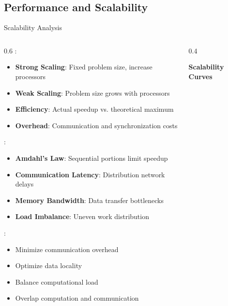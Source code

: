 \subsection{Performance and Scalability}

\begin{frame}{Scalability Analysis}
\begin{columns}
\begin{column}{0.6\textwidth}
:
\begin{itemize}
\item \textbf{Strong Scaling}: Fixed problem size, increase processors
\item \textbf{Weak Scaling}: Problem size grows with processors
\item \textbf{Efficiency}: Actual speedup vs. theoretical maximum
\item \textbf{Overhead}: Communication and synchronization costs
\end{itemize}

\vspace{0.3cm}
:
\begin{itemize}
\item \textbf{Amdahl's Law}: Sequential portions limit speedup
\item \textbf{Communication Latency}: Distribution network delays
\item \textbf{Memory Bandwidth}: Data transfer bottlenecks
\item \textbf{Load Imbalance}: Uneven work distribution
\end{itemize}

\vspace{0.3cm}
:
\begin{itemize}
\item Minimize communication overhead
\item Optimize data locality
\item Balance computational load
\item Overlap computation and communication
\end{itemize}
\end{column}
\begin{column}{0.4\textwidth}
\begin{center}
\textbf{Scalability Curves}
\vspace{0.3cm}

\end{center}
\end{column}
\end{columns}
\end{frame}
